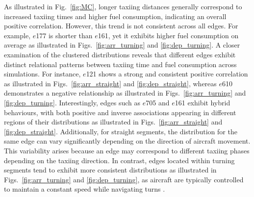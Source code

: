 \documentclass{article}
\begin{document}
As illustrated in Fig.~\ref{fig:MC}, longer taxiing distances generally correspond to increased taxiing times and higher fuel consumption, indicating an overall  positive correlation. However, this trend is not consistent across all edges. For example, $e$177 is shorter than $e$161, yet it exhibits higher fuel consumption on average as illustrated in Figs.~\ref{fig:arr_turning} and \ref{fig:dep_turning}. A closer examination of the clustered distributions reveals that different edges exhibit distinct relational patterns between taxiing time and fuel consumption across simulations. For instance, $e$121 shows a strong and consistent positive correlation as illustrated in Figs.~\ref{fig:arr_straight} and \ref{fig:dep_straight}, whereas $e$610 demonstrates a negative relationship as illustrated in Figs.~\ref{fig:arr_turning} and \ref{fig:dep_turning}. Interestingly, edges such as $e$705 and $e$161 exhibit hybrid behaviours, with both positive and inverse associations appearing in different regions of their distributions as illustrated in Figs.~\ref{fig:arr_straight} and \ref{fig:dep_straight}. Additionally, for straight segments, the distribution for the same edge can vary significantly depending on the direction of aircraft movement. This variability arises because an edge may correspond to different taxiing phases depending on the taxiing direction. In contrast, edges located within turning segments tend to exhibit more consistent distributions as illustrated in Figs.~\ref{fig:arr_turning} and \ref{fig:dep_turning}, as aircraft are typically controlled to maintain a constant speed while navigating turns \cite{weiszer2020multi}.
\end{document}
